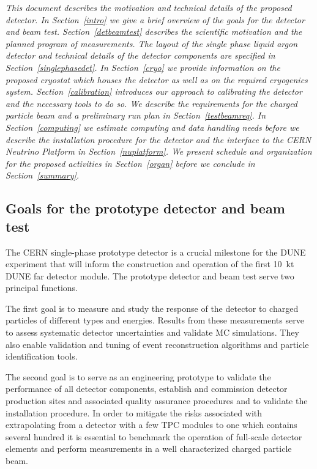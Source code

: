 
{\it 
This document describes the motivation and technical details of the proposed detector. 
In Section~\ref{intro} we give a brief overview of the goals for the detector and beam test.
Section~\ref{detbeamtest} describes the scientific motivation and the planned program of measurements. The layout of the single phase liquid argon detector and technical details of the detector components are specified in Section~\ref{singlephasedet}. In Section~\ref{cryo} we provide information on the proposed cryostat which houses the detector as well as on the required cryogenics system. Section~\ref{calibration} introduces our approach to calibrating the detector and the necessary tools to do so. We describe the requirements for the charged particle beam and a preliminary run plan in Section~\ref{testbeamreq}.
In Section~\ref{computing} we estimate computing and data handling needs before we describe the installation procedure for the detector
and the interface to the CERN Neutrino Platform in Section~\ref{nuplatform}. We present schedule and organization for the proposed activities in Section~\ref{organ} before we conclude in Section~\ref{summary}.}

\label{intro}


\subsection{Goals for the prototype detector and beam test}

The CERN single-phase prototype detector is a crucial milestone for the DUNE experiment that will inform the construction and operation of the first 10~kt DUNE far detector module.  The prototype detector and beam test serve two principal functions. 

The first goal is 
to measure and study the response of the detector to charged particles of different types and energies. 
Results from these measurements serve to assess systematic detector uncertainties and
validate MC simulations. They also enable validation and tuning of event reconstruction algorithms and particle identification tools.

The second goal is 
to serve as an engineering prototype to validate the performance of all detector components,
establish and commission detector production sites and associated quality assurance procedures and to validate the installation procedure. 
%
In order to mitigate the risks associated with extrapolating 
from a detector with a few TPC modules to one which contains several hundred 
 it is essential to benchmark the operation of full-scale detector elements
and perform measurements in a well characterized charged particle beam.  

